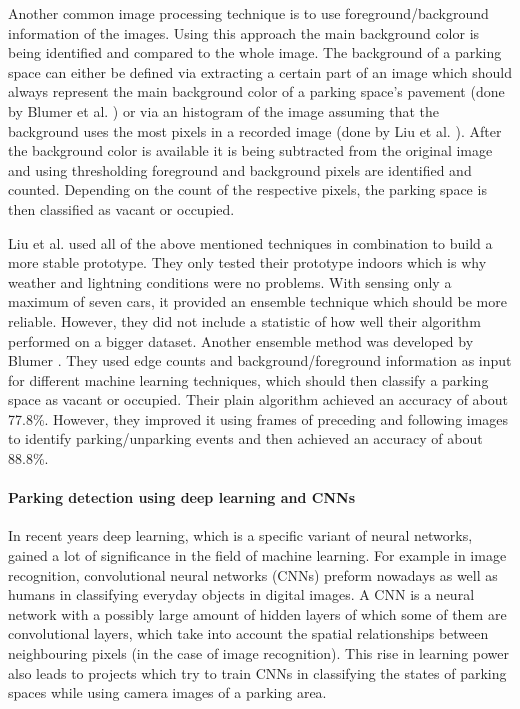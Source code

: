 Another common image processing technique is to use foreground/background information of the images. Using this approach the main background color is being identified and compared to the whole image. The background of a parking space can either be defined via extracting a certain part of an image which should always represent the main background color of a parking space's pavement (done by Blumer et al. \cite{Blumer2012}) or via an histogram of the image assuming that the background uses the most pixels in a recorded image (done by Liu et al. \cite{stationary_camera_sensing}). After the background color is available it is being subtracted from the original image and using thresholding foreground and background pixels are identified and counted. Depending on the count of the respective pixels, the parking space is then classified as vacant or occupied.

Liu et al. \cite{stationary_camera_sensing} used all of the above mentioned techniques in combination to build a more stable prototype. They only tested their prototype indoors which is why weather and lightning conditions were no problems. With sensing only a maximum of seven cars, it provided an ensemble technique which should be more reliable. However, they did not include a statistic of how well their algorithm performed on a bigger dataset. Another ensemble method was developed by Blumer \cite{Blumer2012}. They used edge counts and background/foreground information as input for different machine learning techniques, which should then classify a parking space as vacant or occupied. Their plain algorithm achieved an accuracy of about 77.8\%. However, they improved it using frames of preceding and following images to identify parking/unparking events and then achieved an accuracy of about 88.8\%.


\paragraph{Parking detection using deep learning and CNNs}

In recent years deep learning, which is a specific variant of neural networks, gained a lot of significance in the field of machine learning. For example in image recognition, convolutional neural networks (CNNs) preform nowadays as well as humans in classifying everyday objects in digital images. A CNN is a neural network with a possibly large amount of hidden layers of which some of them are convolutional layers, which take into account the spatial relationships between neighbouring pixels (in the case of image recognition). This rise in learning power also leads to projects which try to train CNNs in classifying the states of parking spaces while using camera images of a parking area.

